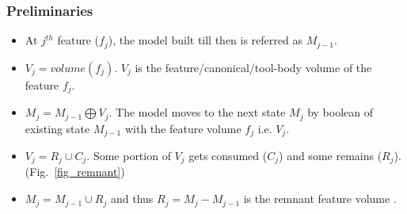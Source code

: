 \subsubsection{Preliminaries}
\begin{itemize}
[noitemsep,topsep=2pt,parsep=2pt,partopsep=2pt]
\item At $j^{th}$ feature ($f_j$), the model built till then is referred as $M_{j-1}$.  
\item $V_j = volume (f_j)$. $V_j$ is the feature/canonical/tool-body volume of the feature $f_j$.
\item $M_j = M_{j-1} \bigoplus V_j$. The model moves to the next state $M_j$ by boolean of existing state $M_{j-1}$ with the feature volume $f_j$ i.e. $V_j$. 
\item $V_j = R_{j} \cup C_j$. Some portion of $V_j$ gets consumed ($C_j$) and some remains ($R_j$). (Fig.~\ref{fig_remnant})
\item $M_j = M_{j-1} \cup  R_j$ and thus $R_j = M_{j} -   M_{j -1}$ is the remnant feature volume  \cite{Lee2005}.
\end{itemize} 

\bigskip

